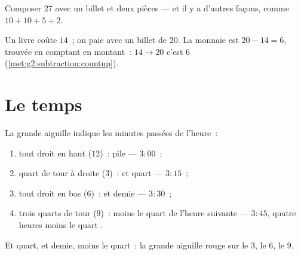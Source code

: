 \begin{omfigure}

{\small Composer $27$ avec un billet et deux pièces --- et il y a
d'autres façons, comme $10 + 10 + 5 + 2$.}
\end{omfigure}

\begin{example}[La monnaie]\label{ex:g2:measure:change}
Un livre coûte $14$~; on paie avec un billet de $20$. La monnaie
est $20 - 14 = 6$, trouvée en comptant en montant~:
$14 \to 20$ c'est $6$ (\cref{met:g2:subtraction:countup}).
\end{example}

\section{Le temps}

\begin{method}\label{met:g2:measure:clock}
La grande aiguille indique les minutes passées de l'heure~:
\begin{enumerate}
  \item tout droit en haut ($12$)~: pile --- $3{:}00$~;
  \item quart de tour à droite ($3$)~: et quart --- $3{:}15$~;
  \item tout droit en bas ($6$)~: et demie --- $3{:}30$~;
  \item trois quarts de tour ($9$)~: moins le quart de l'heure
        suivante --- $3{:}45$, \guillemotleft{} quatre heures moins
        le quart \guillemotright{}.
\end{enumerate}
\end{method}

\begin{omfigure}

{\small Et quart, et demie, moins le quart~: la grande aiguille rouge
sur le $3$, le $6$, le $9$.}
\end{omfigure}

